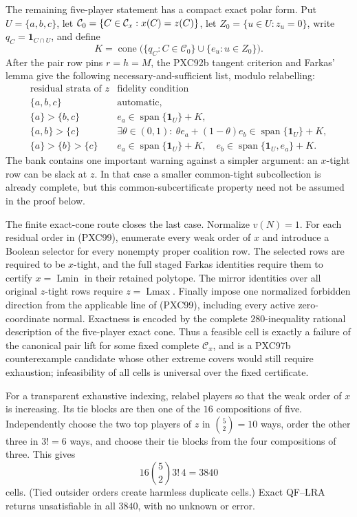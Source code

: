 \documentclass[11pt]{article}
\newcommand{\Lmin}{\operatorname{Lmin}}
\newcommand{\Lmax}{\operatorname{Lmax}}
\newcommand{\one}{\mathbf 1}
\begin{document}
The remaining five-player statement has a compact exact polar form.  Put
$U=\{a,b,c\}$, let
${\cal C}_0=\{C\in\mathcal C_x:x(C)=z(C)\}$, let
$Z_0=\{u\in U:z_u=0\}$, write
$q_C=\one_{C\cap U}$, and define
\[
 K=\operatorname{cone}\bigl(\{q_C:C\in\mathcal C_0\}
              \cup\{e_u:u\in Z_0\}\bigr).
\]
After the pair row pins $r=h=M$, the PXC92b tangent criterion and Farkas'
lemma give the following necessary-and-sufficient list, modulo relabelling:
\[
\begin{array}{c|c}
\text{residual strata of }z&\text{fidelity condition}\\ \hline
\{a,b,c\}&\text{automatic},\\
\{a\}>\{b,c\}&e_a\in\operatorname{span}\{\one_U\}+K,\\
\{a,b\}>\{c\}&
 \exists\theta\in(0,1):\
 \theta e_a+(1-\theta)e_b\in\operatorname{span}\{\one_U\}+K,\\
\{a\}>\{b\}>\{c\}&
 e_a\in\operatorname{span}\{\one_U\}+K,\quad
 e_b\in\operatorname{span}\{\one_U,e_a\}+K.
\end{array}                                                   \tag{PXC99}
\]
The bank contains one important warning against a simpler argument: an
$x$-tight row can be slack at $z$.  In that case a smaller common-tight
subcollection is already complete, but this common-subcertificate property
need not be assumed in the proof below.

The finite exact-cone route closes the last case.  Normalize $v(N)=1$.
For each residual order in (PXC99), enumerate every weak order of $x$ and
introduce a Boolean selector for every nonempty proper coalition row.
The selected rows are required to be $x$-tight, and the full staged Farkas
identities require them to certify $x=\Lmin$ in their retained polytope.
The mirror identities over all original $z$-tight rows require $z=\Lmax$.
Finally impose one normalized forbidden direction from the applicable line
of (PXC99), including every active zero-coordinate normal.  Exactness is
encoded by the complete $280$-inequality rational description of the
five-player exact cone.  Thus a feasible cell is exactly a failure of the
canonical pair lift for some fixed complete $\mathcal C_x$, and is a PXC97b
counterexample candidate whose other extreme covers would still require
exhaustion; infeasibility of all cells is universal over the fixed certificate.

For a transparent exhaustive indexing, relabel players so that the weak
order of $x$ is increasing.  Its tie blocks are then one of the $16$
compositions of five.  Independently choose the two top players of $z$ in
$\binom52=10$ ways, order the other three in $3!=6$ ways, and choose their
tie blocks from the four compositions of three.  This gives
\[
             16\binom52 3!\,4=3840                         \tag{PXC99a}
\]
cells.  (Tied outsider orders create harmless duplicate cells.)  Exact
QF--LRA returns unsatisfiable in all $3840$, with no unknown or error.
\end{document}

